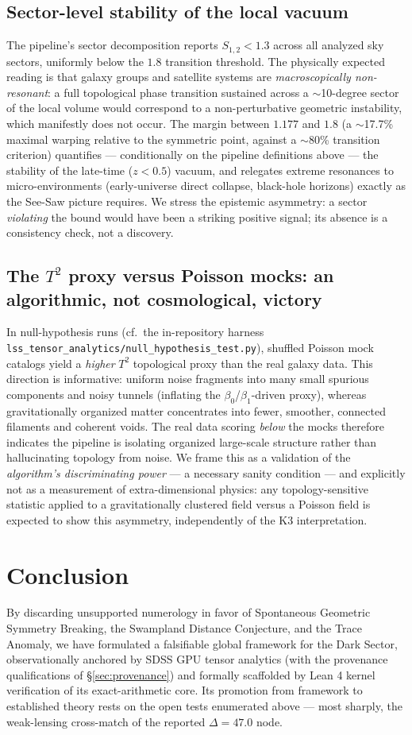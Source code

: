 \documentclass[aps,prd,twocolumn,nofootinbib,superscriptaddress,10pt]{revtex4-2}
\begin{document}
\subsection{Sector-level stability of the local vacuum}
The pipeline's sector decomposition reports $S_{1,2} < 1.3$ across all analyzed sky sectors, uniformly below the $1.8$ transition threshold. The physically expected reading is that galaxy groups and satellite systems are \emph{macroscopically non-resonant}: a full topological phase transition sustained across a $\sim$10-degree sector of the local volume would correspond to a non-perturbative geometric instability, which manifestly does not occur. The margin between $1.177$ and $1.8$ (a $\sim$17.7\% maximal warping relative to the symmetric point, against a $\sim$80\% transition criterion) quantifies --- conditionally on the pipeline definitions above --- the stability of the late-time ($z < 0.5$) vacuum, and relegates extreme resonances to micro-environments (early-universe direct collapse, black-hole horizons) exactly as the See-Saw picture requires. We stress the epistemic asymmetry: a sector \emph{violating} the bound would have been a striking positive signal; its absence is a consistency check, not a discovery.

\subsection{The $T^2$ proxy versus Poisson mocks: an algorithmic, not cosmological, victory}
In null-hypothesis runs (cf.\ the in-repository harness \texttt{lss\_tensor\_analytics/null\_hypothesis\_test.py}), shuffled Poisson mock catalogs yield a \emph{higher} $T^2$ topological proxy than the real galaxy data. This direction is informative: uniform noise fragments into many small spurious components and noisy tunnels (inflating the $\beta_0$/$\beta_1$-driven proxy), whereas gravitationally organized matter concentrates into fewer, smoother, connected filaments and coherent voids. The real data scoring \emph{below} the mocks therefore indicates the pipeline is isolating organized large-scale structure rather than hallucinating topology from noise. We frame this as a validation of the \emph{algorithm's discriminating power} --- a necessary sanity condition --- and explicitly not as a measurement of extra-dimensional physics: any topology-sensitive statistic applied to a gravitationally clustered field versus a Poisson field is expected to show this asymmetry, independently of the K3 interpretation.

\section{Conclusion}
By discarding unsupported numerology in favor of Spontaneous Geometric Symmetry Breaking, the Swampland Distance Conjecture, and the Trace Anomaly, we have formulated a falsifiable global framework for the Dark Sector, observationally anchored by SDSS GPU tensor analytics (with the provenance qualifications of \S\ref{sec:provenance}) and formally scaffolded by Lean 4 kernel verification of its exact-arithmetic core. Its promotion from framework to established theory rests on the open tests enumerated above --- most sharply, the weak-lensing cross-match of the reported $\Delta = 47.0$ node.
\end{document}

